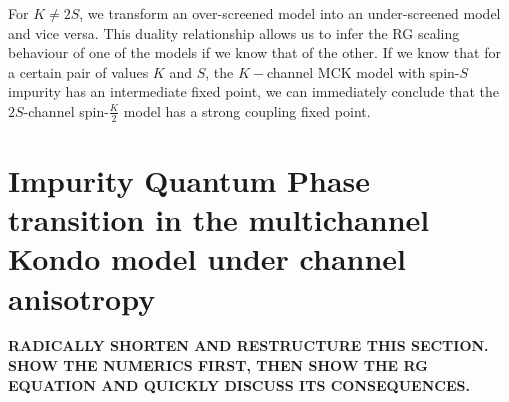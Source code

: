 \documentclass[reprint,prb,superscriptaddress]{revtex4-1}
\begin{document}
For \(K \neq 2S\), we transform an over-screened model into an under-screened model and vice versa. This duality relationship allows us to infer the RG scaling behaviour of one of the models if we know that of the other. If we know that for a certain pair of values \(K\) and \(S\), the \(K-\)channel MCK model with spin-\(S\) impurity has an intermediate fixed point, we can immediately conclude that the \(2S\)-channel spin-\(\frac{K}{2}\) model has a strong coupling fixed point.

\section{Impurity Quantum Phase transition in the multichannel Kondo model under channel anisotropy}
\label{anisotropic_rg}
\textbf{RADICALLY SHORTEN AND RESTRUCTURE THIS SECTION. SHOW THE NUMERICS FIRST, THEN SHOW THE RG 
EQUATION AND QUICKLY DISCUSS ITS CONSEQUENCES.}
\end{document}
